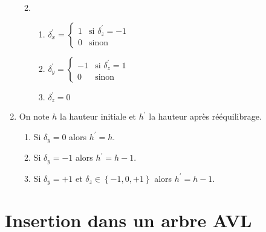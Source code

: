 \documentclass[article,11pt]{article}
\newcommand{\bgbr}[1]{
    \left\{#1\right\}
}
\begin{document}
\begin{enumerate}
\begin{enumerate}[label=\alph*)]
\begin{center}
\begin{tikzpicture}
\end{tikzpicture}
\end{center}
\item\begin{enumerate}[label=-]
\item$\delta^{'}_{x}=\begin{cases}
1 & \text{si }\delta^{'}_{z}=-1\\
0 & \text{sinon}
\end{cases}$
\item$\delta^{'}_{y}=\begin{cases}
-1 & \text{si }\delta^{'}_{z}=1\\
0 & \text{sinon}
\end{cases}$
\item$\delta^{'}_{z}=0$
\end{enumerate}
\end{enumerate}
\item On note $h$ la hauteur initiale et $h^{'}$ la hauteur après rééquilibrage.
\begin{enumerate}[label=\arabic*)]
\item Si $\delta_{y}=0$ alors $h^{'}=h$.
\item Si $\delta_{y}=-1$ alors $h^{'}=h-1$.
\item Si $\delta_{y}=+1$ et $\delta_{z}\in\bgbr{-1,0,+1}$ alors $h^{'}=h-1$.
\end{enumerate}
\end{enumerate}

\section{Insertion dans un arbre AVL}
\end{document}
